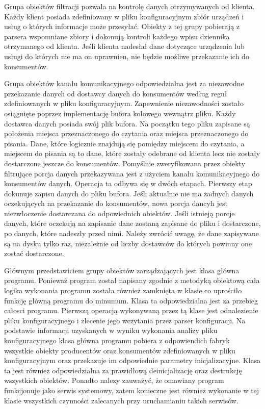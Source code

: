 Grupa obiektów filtracji pozwala na kontrolę danych otrzymywanych od
klienta. Każdy klient posiada zdefiniowany w pliku konfiguracyjnym
zbiór urządzeń i usług o których informacje może przesyłać. Obiekty z
tej grupy pobierają z parsera wspomniane zbiory i dokonują kontroli
każdego wpisu dziennika otrzymanego od klienta. Jeśli klienta nadesłał
dane dotyczące urządzenia lub usługi do których nie ma on uprawnien,
nie będzie możliwe przekazanie ich do konsumentów.

Grupa obiektów kanału komunikacyjnego odpowiedzialna jest za
niezawodne przekazanie danych od dostawcy danych do konsumentów według
reguł zdefiniowanych w pliku konfiguracyjnym. Zapewnienie
niezawodności zostało osiągnięte poprzez implementację bufora kołowego
wewnątrz pliku. Każdy dostawca danych posiada swój plik bufora. Na
początku tego pliku zapisane są położenia miejsca przeznaczonego do
czytania oraz miejsca przeznaczonego do pisania. Dane, które logicznie
znajdują się pomiędzy miejscem do czytania, a miejscem do pisania są
to dane, które zostały odebrane od klienta lecz nie zostały
dostarczone jeszcze do konsumentów. Pomyślnie zweryfikowana przez
obiekty filtrujące porcja danych przekazywana jest z użyciem kanału
komunikacyjnego do konsumentów danych. Operacja ta odbywa się w dwóch
etapach. Pierwszy etap dokunuje zapisu danych do pliku bufora. Jeśli
aktualnie nie ma żadnych danych oczekujących na przekazanie do
konsumentów, nowa porcja dancyh jest niezwłoczenie dostarczana do
odpowiednich obiektów. Jeśli istnieją porcje danych, które oczekują na
zapisanie dane zostaną zapisane do pliku i dostarczone, po danych,
które nadeszły przed nimi. Należy zwrócić uwagę, że dane zapisywane są
na dysku tylko raz, niezależnie od liczby dostawców do których powinny
one zostać dostarczone.

Głównym przedstawiciem grupy obiektów zarządzających jest klasa główna
programu. Ponieważ program został napisany zgodnie z metodyką
obiektową cała logika wykonania programu została również zamknięta w
klasie co uprościło funkcję główną programu do minumum. Klasa ta
odpowiedzialna jest za przebieg całosci programu. Pierwszą operacją
wykonywaną przez tą klase jest odnalezienie pliku konfiguracyjnego i
zlecenie jego wczytania przez parser konfiguracji. Na podstawie
informacji uzyskanych w wyniku wykonania analizy pliku
konfiguracyjnego klasa główna programu pobiera z odpowiendich fabryk
wszystkie obiekty producentów oraz konsumentów zdefiniowanych w pliku
konfiguracyjnym oraz przekazuje im odpowiednie parametry
inicjalizacyjne. Klasa ta jest również odpowiedzialna za prawidłową
deinicjalizację oraz destrukcję wszystkich obiektów. Ponadto nalezy
zauważyć, że omawiany program funkcjonuje jako serwis systemowy, zatem
konieczne jest również wykonanie w tej klasie wszystkich czynności
zalecanych przy uruchamianiu takich serwisów.


